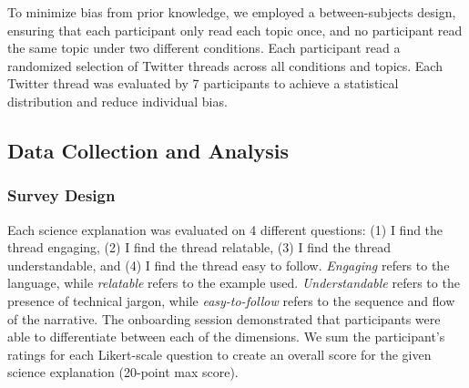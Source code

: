 To minimize bias from prior knowledge, we employed a between-subjects design, ensuring that each participant only read each topic once, and no participant read the same topic under two different conditions. Each participant read a randomized selection of Twitter threads across all conditions and topics. Each Twitter thread was evaluated by 7 participants to achieve a statistical distribution and reduce individual bias.

\subsection{Data Collection and Analysis}
\label{Data}

\subsubsection{Survey Design}
\label{survey_design}
Each science explanation was evaluated on 4 different questions: (1) I find the thread engaging, (2) I find the thread relatable, (3) I find the thread understandable, and (4) I find the thread easy to follow. \textit{Engaging} refers to the language, while \textit{relatable} refers to the example used. \textit{Understandable} refers to the presence of technical jargon, while \textit{easy-to-follow} refers to the sequence and flow of the narrative. The onboarding session demonstrated that participants were able to differentiate between each of the dimensions. We sum the participant's ratings for each Likert-scale question to create an overall score for the given science explanation (20-point max score).

 



